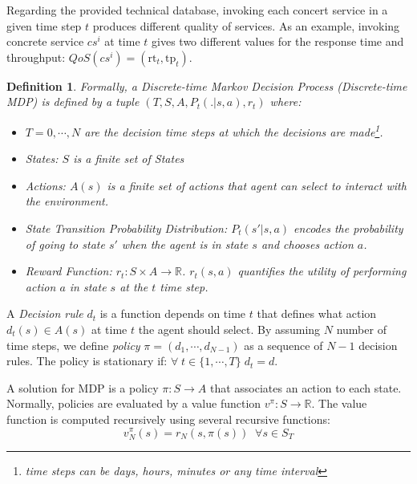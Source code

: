 \documentclass[10pt,journal,compsoc]{IEEEtran}
\newtheorem{definition}{Definition}
\begin{document}
Regarding the provided technical database, invoking each concert service in a given time step $t$ produces different quality of services. As an example, invoking concrete service $cs^i$ at time $t$ gives two different values for the response time and throughput: $QoS(cs^i) = (\text{rt}_t, \text{tp}_t)$. 

\begin{definition}
Formally, a \emph{Discrete-time Markov Decision Process (Discrete-time MDP)} \cite{timeMDP} is defined by a tuple $(T, S, A, P_t(.|s,a), r_t)$ where:

\begin{itemize}
\item[-] $T=0,\cdots, N$ are the decision time steps at which the decisions are made\footnote{time steps can be days, hours, minutes or any time interval}. 
\item[-]States: $S$ is a finite set of States
\item[-] Actions: $A(s)$ is a finite set of actions that agent can select to interact with the environment.
\item[-] State Transition Probability Distribution: $P_t(s'| s,a)$ encodes the probability of going to state $s'$ when the agent is in state $s$ and chooses action $a$.
\item[-] Reward Function: $r_t : S \times A \longrightarrow \mathbb{R}$. $r_t(s,a)$ quantifies the utility of performing action $a$ in state $s$ at the $t$ time step.
\end{itemize}

\end{definition}

A \emph{Decision rule} $d_t$ is a function depends on time $t$ that defines what action $d_t(s) \in A(s)$ at time $t$ the agent should select. By assuming $N$ number of time steps, we define \emph{policy} $\pi = (d_1, \cdots, d_{N-1})$ as a sequence of $N-1$  decision rules. The policy is stationary if: $\forall \; t \in \{1, \cdots, T \} \; d_t = d$. 

A solution for MDP is a policy $\pi: S \longrightarrow A$ that associates an action to each state. Normally, policies are evaluated by a value function $v^{\pi} : S \longrightarrow \mathbb{R}$. The value function is computed recursively using several recursive functions: %
\begin{equation}
v^{\pi}_N(s) = r_N(s, \pi(s)) \;\; \forall s\in S_T
\end{equation}
\end{document}
